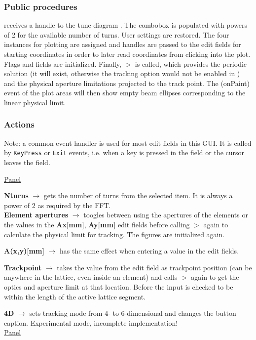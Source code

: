 \documentclass[12pt]{article}
\newcommand\code[1]{{\tt #1}}
\newcommand{\ofld}[1]{\colorbox{black!15}{{{\color{black}\bf #1}}}}
\newcommand{\ofldx}[1]{\colorbox{black!15}{{\color{black}(#1)}}}
\newcommand\guico[1]{{\color{blue}\code{#1}}}
\newcommand{\unico}[1]{{\color{burntorange}\code{#1}}}
\newcommand{\evcod}[2]{\ofld{#1} $\rightarrow$ \guico{#2}}
\newcommand{\prcod}[2]{\opauni{#1}$>$\unico{#2}}
\newcommand{\opagui}[1]{\colorbox{blue!20}{{\color{black}\code{#1}}}}
\newcommand{\ogui}[1]{\hyperref[#1]{\opagui{#1}}}
\newcommand{\opaguif}[1]{\colorbox{violet!30}{{\color{black}\code{#1}}}}
\newcommand{\oguif}[1]{\hyperref[#1]{\opaguif{#1}}}
\newcommand{\opauni}[1]{\colorbox{orange!30}{{\color{black}\code{#1}}}}
\newcommand{\act}[1]{\subsubsection*{Actions} #1}
\newcommand{\ppro}[1]{\subsubsection*{Public procedures} #1}
\newcommand{\todo}[1]{{\color{red} #1}}
\begin{document}
\ppro{
\guico{Start} receives a handle to the tune diagram \ogui{opatunediag}. The combobox \guico{comTurns} is populated with powers of 2 for the available number of turns. User settings are restored. The four \oguif{comfigureframe} instances for plotting are assigned and handles are passed to the edit fields for starting coordinates in order to later read coordinates from clicking into the plot. Flags and fields are initialized. Finally, \prcod{tracklib}{Initdpp} is called, which provides the periodic solution (it will exist, otherwise the tracking option would not be enabled in \ogui{opamenu}) and the physical aperture limitations projected to the track point. The \ofldx{onPaint} event of the plot areas will then show empty beam ellipses corresponding to the linear physical limit. 
}

\act{}

Note: a common event handler \guico{ediAction} is used for most edit fields in this GUI. It is called by \code{KeyPress} or \code{Exit} events, i.e. when a key is pressed in the field or the cursor leaves the field.


\underline{Panel \guico{PanParam}}

\evcod{Nturns}{comTurnsChange} gets the number of turns from the selected item. It is always a power of 2 as required by the FFT.\\[1ex]

\evcod{Element apertures}{cbxElAperClick} toogles between using the apertures of the elements or the values in the \ofld{Ax[mm]}, \ofld{Ay[mm]} edit fields before calling \prcod{tracklib}{Initdpp} again to calculate the physical limit for tracking. The \guico{psx,psy} figures are initialized again.

\evcod{A(x,y)[mm]}{ediAction[edi(x,y)aper]} has the same effect when entering a value in the edit fields. 

\evcod{Trackpoint}{ediAction[edistartpos]} takes the value from the edit field as trackpoint position (can be anywhere in the lattice, even inside an element) and calls \prcod{tracklib}{Initdpp} again to get the optics and aperture limit at that location. Before the input is checked to be within the length of the active lattice segment.

\evcod{4D}{butT6Click} sets tracking mode from 4- to 6-dimensional and changes the button caption. \todo{Experimental mode, incomplete implementation!}\\[1ex]

\underline{Panel \guico{PanCtrl}}
\end{document}
